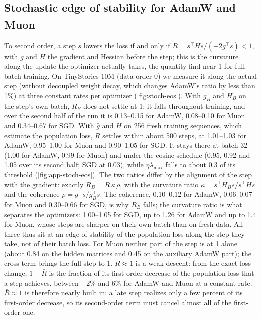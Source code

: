 \documentclass[10pt]{article}
\newcommand{\extra}{\textsuperscript{\dag}}  %
\newcommand{\lmax}{\lambda_{\max}}
\begin{document}
\subsection{Stochastic edge of stability for AdamW and Muon\extra}
\label{sec:res-stoch-eos}

To second order, a step $s$ lowers the loss if and only if $R=s^\top Hs/(-2g^\top s)<1$, with $g$ and $H$ the gradient and
Hessian before the step; this is the curvature along the update the optimizer actually takes, the quantity
\citet{lee2026road} find near 1 for full-batch training. On TinyStories-10M (data order 0) we measure it along the
actual step (without decoupled weight decay, which changes AdamW's ratio by less than 1\%) at three constant rates per optimizer
(\cref{fig:stoch-eos}). With $g_B$ and $H_B$ on the step's own batch, $R_B$ does not settle at 1: it falls throughout
training, and over the second half of the run it is 0.13--0.15 for AdamW, 0.08--0.10 for Muon and 0.34--0.67 for SGD.
With $\bar g$ and $\bar H$ on 256 fresh training sequences, which estimate the population loss, $\bar R$ settles
within about 500 steps, at 1.01--1.03 for AdamW, 0.95--1.00 for Muon and 0.90--1.05 for SGD. It stays there at
batch 32 (1.00 for AdamW, 0.99 for Muon) and under the cosine schedule (0.95, 0.92 and 1.05 over its second half; SGD at 0.03),
while $\eta\lmax$ falls to about 0.3 of its threshold (\cref{fig:app-stoch-eos}). The two ratios differ by the
alignment of the step with the gradient: exactly $R_B=\bar R\,\kappa\,\rho$, with the curvature ratio
$\kappa=s^\top H_Bs/s^\top\bar Hs$ and the coherence $\rho=\bar g^\top s/g_B^\top s$. The coherence, 0.10--0.12 for
AdamW, 0.06--0.07 for Muon and 0.30--0.66 for SGD, is why $R_B$ falls; the curvature ratio is what separates the
optimizers: 1.00--1.05 for SGD, up to 1.26 for AdamW and up to 1.4 for Muon, whose steps are sharper on their own
batch than on fresh data. All three thus sit at an edge of stability of the population loss along the step they
take, not of their batch loss. For Muon neither part
of the step is at 1 alone (about 0.84 on the hidden matrices and 0.45 on the auxiliary AdamW part); the cross term
brings the full step to 1. $\bar R\approx1$ is a weak descent: from the exact loss change, $1-\bar R$ is the fraction
of its first-order decrease of the population loss that a step achieves, between $-2\%$ and $6\%$ for AdamW and Muon at a constant rate.
$\bar R\approx1$ is therefore nearly built in: a late step realizes only a few percent of its first-order decrease,
so its second-order term must cancel almost all of the first-order one.
\end{document}
